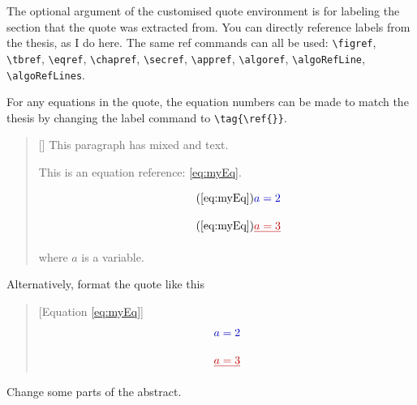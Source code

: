 \documentclass{AuthorResponse}
\begin{document}
The optional argument of the customised quote environment is for labeling the section that the quote was extracted from. You can directly reference labels from the thesis, as I do here. The same ref commands can all be used: \verb|\figref|, \verb|\tbref|, \verb|\eqref|, \verb|\chapref|, \verb|\secref|, \verb|\appref|, \verb|\algoref|, \verb|\algoRefLine|, \verb|\algoRefLines|.

For any equations in the quote, the equation numbers can be made to match the thesis by changing the label command to \verb|\tag{\ref{}}|.

\begin{quote}[]
	This paragraph has mixed  and  text.



	This is an equation reference: \eqref{eq:myEq}.

	\begin{equation} \tag{\ref{eq:myEq}}
		\DIFadd{a = 2}
	\end{equation}

	\begin{equation} \tag{\ref{eq:myEq}}
		\DIFdel{a = 3}
	\end{equation}
	
	where $a$ is a variable.
\end{quote}

Alternatively, format the quote like this

\begin{quote}[Equation \ref{eq:myEq}]
	\begin{equation} \notag
		\DIFadd{a = 2}
	\end{equation}

	\begin{equation} \notag
		\DIFdel{a = 3}
	\end{equation}
\end{quote}

\RC Change some parts of the abstract.
\end{document}
